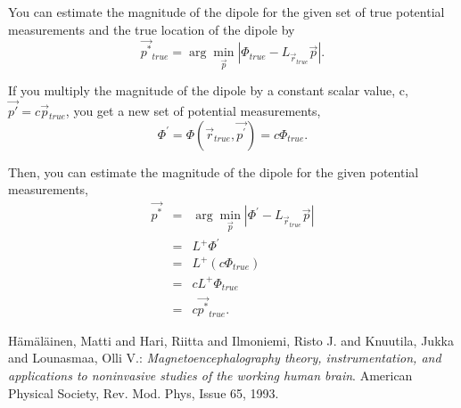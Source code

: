 \documentclass[10pt,letterpaper]{article}
\begin{document}
You can estimate the magnitude of the dipole for the given set of true potential
measurements and the true location of the dipole by 
\begin{equation}
\overrightarrow{p^{*}}\!\!_{true} = \arg\!\min\limits_{\overrightarrow{p}} | \Phi_{true} - L_{\overrightarrow{r}\!\!_{true}} \overrightarrow{p} |.
\end{equation}

If you multiply the magnitude of the dipole by a constant scalar value, c, 
$\overrightarrow{p'} = c \overrightarrow{p}\!_{true}$, you get a new set of potential measurements, 
\begin{equation}
\Phi^{'} = \Phi( \overrightarrow{r}\!\!_{true},  \overrightarrow{p^{'}}  ) = c \Phi_{true}.
\end{equation}

Then, you can estimate the magnitude of the dipole for the given potential measurements,
\begin{eqnarray}
\overrightarrow{p^{*}} & = & \arg\!\min\limits_{\overrightarrow{p}} | \Phi^{'} - L_{\overrightarrow{r}\!\!_{true}} \overrightarrow{p} | \nonumber \\
& = & L^{+} \Phi^{'} \nonumber \\
& = & L^{+} (c \Phi_{true}) \nonumber \\
& = & c L^{+} \Phi_{true} \nonumber \\ 
& = & c  \overrightarrow{p^{*}}\!\!_{true}.
\end{eqnarray}

\begin{thebibliography}{9}

  H\"am\"al\"ainen, Matti and Hari, Riitta and Ilmoniemi, Risto J. and Knuutila, Jukka and Lounasmaa, Olli V.:
  \emph{Magnetoencephalography theory, instrumentation, and applications
to noninvasive studies of the working human brain}.
  American Physical Society,
  Rev. Mod. Phys, Issue 65,
  1993.

\end{thebibliography}
\end{document}
